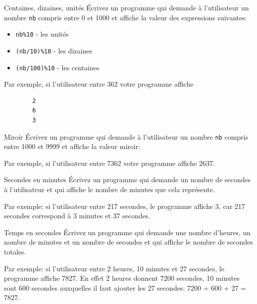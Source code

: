 \documentclass[a4paper,11pt]{article}
\begin{document}
	\begin{Exercice}{Centaines, dizaines, unités} 
		\'Ecrivez un programme qui demande à l'utilisateur 
		un nombre \texttt{nb} compris entre 0 et 1000 et affiche la valeur des expressions suivantes:
		\begin{itemize}
			\item \texttt{nb\%10} - les unités
			\item \texttt{(nb/10)\%10} - les dizaines
			\item \texttt{(nb/100)\%10} - les centaines
		\end{itemize}
		Par exemple, si l'utilisateur entre 362 votre programme affiche
		\begin{verbatim}
		2
		6
		3
		\end{verbatim}
	\end{Exercice}	

	\begin{Exercice}{Miroir} 
		\'Ecrivez un programme qui demande à l'utilisateur 
		un nombre \texttt{nb} compris entre 1000 et 9999 et affiche la valeur miroir:

		Par exemple, si l'utilisateur entre 7362 votre programme affiche 2637.
	\end{Exercice}	

	
	\begin{Exercice}{Secondes en minutes} 
		\'Ecrivez un programme qui demande 
		un nombre de secondes à l'utilisateur
		et qui affiche le nombre de minutes que cela représente.

		Par exemple: 
		si l'utilisateur entre 217 secondes, le programme affiche 3, 
		car 217 secondes correspond à 3 minutes et 37 secondes.
	\end{Exercice}

	\begin{Exercice}{Temps en secondes} 
		\'Ecrivez un programme qui demande 
		une nombre d'heures, un nombre de minutes et un nombre de secondes
		et qui affiche le nombre de secondes totales.
		
		Par exemple: si l'utilisateur entre 2 heures, 10 minutes et 27 secondes, le programme affiche
		7827. En effet 2 heures donnent 7200 secondes, 10 minutes sont 600 secondes 
		auxquelles il faut ajouter les 27 secondes: 7200 + 600 + 27 = 7827. 
	\end{Exercice}

\end{document}
